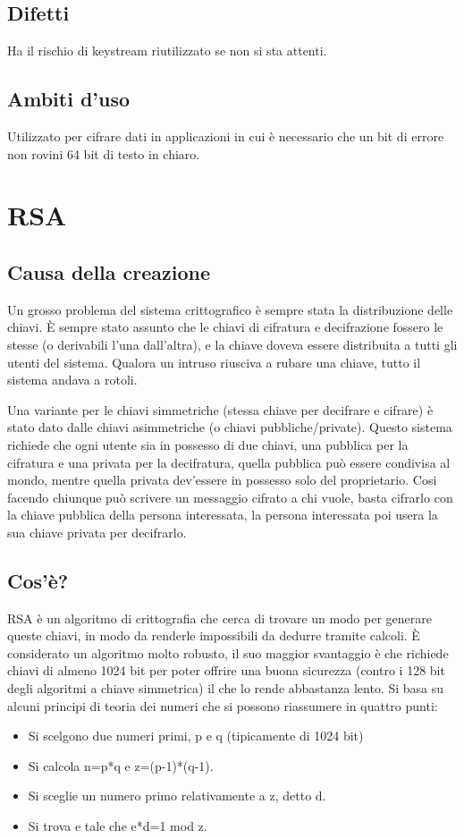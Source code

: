 \subsection{Difetti}
Ha il rischio di keystream riutilizzato se non si sta attenti.
\subsection{Ambiti d'uso}
Utilizzato per cifrare dati in applicazioni in cui è necessario che un bit di errore non rovini 64 bit di testo in chiaro.

\section{RSA}
\subsection{Causa della creazione}
Un grosso problema del sistema crittografico è sempre stata la distribuzione delle chiavi. 
È sempre stato assunto che le chiavi di cifratura e decifrazione fossero le stesse (o derivabili l'una dall'altra), e la chiave doveva essere distribuita a tutti gli utenti del sistema. Qualora un intruso riusciva a rubare una chiave, tutto il sistema andava a rotoli.

Una variante per le chiavi simmetriche (stessa chiave per decifrare e cifrare) è stato dato dalle chiavi asimmetriche (o chiavi pubbliche/private).
Questo sistema richiede che ogni utente sia in possesso di due chiavi, una pubblica per la cifratura e una privata per la decifratura, quella pubblica può essere condivisa al mondo, mentre quella privata dev'essere in possesso solo del proprietario.
Cosi facendo chiunque può scrivere un messaggio cifrato a chi vuole, basta cifrarlo con la chiave pubblica della persona interessata, la persona interessata poi usera la sua chiave privata per decifrarlo.
\subsection{Cos'è?}
RSA è un algoritmo di crittografia che cerca di trovare un modo per generare queste chiavi, in modo da renderle impossibili da dedurre tramite calcoli.
È considerato un algoritmo molto robusto, il suo maggior svantaggio è che richiede chiavi di almeno 1024 bit per poter offrire una buona sicurezza (contro i 128 bit degli algoritmi a chiave simmetrica) il che lo rende abbastanza lento.
Si basa su alcuni principi di teoria dei numeri che si possono riassumere in quattro punti:
\begin{itemize}
\item	Si scelgono due numeri primi, p e q (tipicamente di 1024 bit)
\item	Si calcola n=p*q    e   z=(p-1)*(q-1).
\item	Si sceglie un numero primo relativamente a z, detto d.
\item	Si trova e tale che e*d=1 mod z.
\end{itemize}

